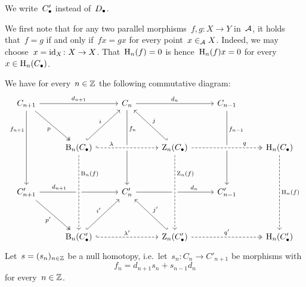 \section{}

We write~$C_\bullet'$ instead of~$D_\bullet$.

We first note that for any two parallel morphisms~$f, g \colon X \to Y$ in~$\mathcal{A}$, it holds that~$f = g$ if and only if~$fx = gx$ for every point~$x \in_{\mathcal{A}} X$.
Indeed, we may choose~$x = \operatorname{id}_X \colon X \to X$.
That~$\operatorname{H}_n(f) = 0$ is hence~$\operatorname{H}_n(f) x = 0$ for every~$x \in \operatorname{H}_n(C_\bullet)$.

We have for every~$n \in \mathbb{Z}$ the following commutative diagram:
\[
  \begin{tikzcd}[row sep = huge, column sep = 2.7em]
      C_{n+1}
      \arrow{rr}[above]{d_{n+1}}
      \arrow{dd}[left, near start]{f_{n+1}}
      \arrow[two heads]{dr}[below left]{p}
    & {}
    & C_n
      \arrow{rr}[above]{d_n}
      \arrow{dd}[right, near start]{f_n}
    & {}
    & C_{n-1}
      \arrow{dd}[right, near start]{f_{n-1}}
    & {}
    \\
      {}
    & \Bl_n(\Ccc)
      \arrow[hook]{ur}[above left]{i}
    & {}
    & \Zl_n(\Ccc)
      \arrow[hook']{ul}[above right]{j}
      \arrow[hook,from=ll, dashed, crossing over, "\lambda", near start]
    & {}
    & \Hl_n(\Ccc)
      \arrow[two heads,from=ll, dashed, crossing over, "q", near end]
      \arrow[dashed]{dd}[right]{\Hl_n(f)}
    \\
      C'_{n+1}
      \arrow{rr}[above, near start]{d_{n+1}}
      \arrow[two heads]{dr}[below left]{p'}
    & {}
    & C'_n
      \arrow{rr}[above, near end]{d_n}
    & {}
    & C'_{n-1}
    & {}
    \\
      {}
    & \Bl_n(\Ccc')
      \arrow[hook]{ur}[above left]{i'}
      \arrow[hook,dashed]{rr}[above]{\lambda'}
      \arrow[from=uu, dashed, crossing over, "\Bl_n(f)", near start]
    & {}
    & \Zl_n(\Ccc')
      \arrow[hook']{ul}[above right]{j'}
      \arrow[two heads,dashed]{rr}[above]{q'}
      \arrow[from=uu, dashed, crossing over, "\Zl_n(f)", near start]
    & {}
    & \Hl_n(\Ccc')
  \end{tikzcd}
\]
Let~$s = (s_n)_{n \in \mathbb{Z}}$ be a null homotopy, i.e.\ let~$s_n \colon C_n \to C'_{n+1}$ be morphisms with
\[
  f_n = d_{n+1} s_n + s_{n-1} d_n
\]
for every~$n \in \mathbb{Z}$.

